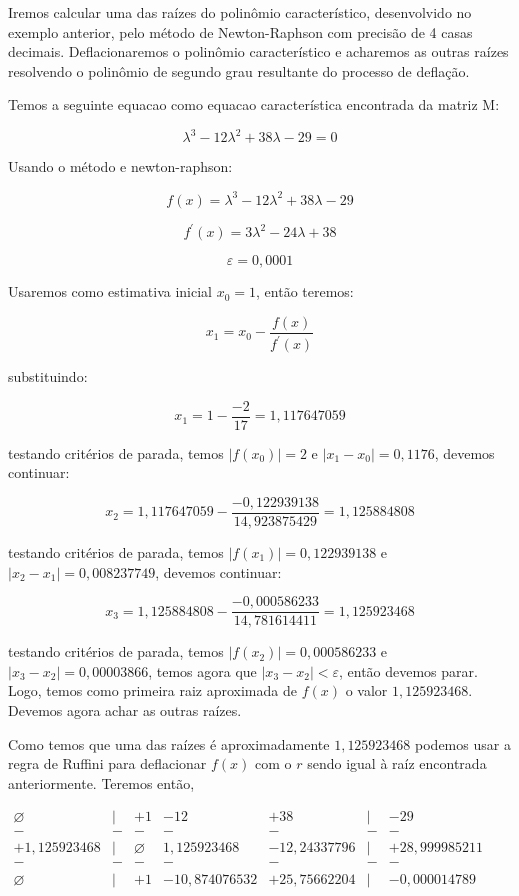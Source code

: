 \begin{example}
 Iremos calcular uma das raízes do polinômio característico, desenvolvido no exemplo anterior, pelo método de Newton-Raphson com precisão de 4 casas decimais. Deflacionaremos o polinômio característico e acharemos as outras raízes resolvendo o polinômio de segundo grau resultante do processo de deflação. 

Temos a seguinte equacao como equacao característica encontrada da matriz M:

$$\lambda^{3}-12\lambda^{2}+38\lambda-29=0$$

Usando o método e newton-raphson:

$$f(x)=\lambda^{3}-12\lambda^{2}+38\lambda-29$$

$$f^{'}(x)=3\lambda^{2}-24\lambda+38$$

$$\varepsilon=0,0001$$

Usaremos como estimativa inicial $x_{0}=1$, então teremos:

$$x_{1}=x_{0}-\frac{f(x)}{f^{'}(x)}$$

substituindo:

$$x_{1}=1-\frac{-2}{17}=1,117647059$$

testando critérios de parada, temos $|f(x_{0})|=2$ e $|x_{1}-x_{0}|=0,1176$, devemos continuar:

$$x_{2}=1,117647059-\frac{-0,122939138}{14,923875429}=1,125884808$$

testando critérios de parada, temos $|f(x_{1})|=0,122939138$ e $|x_{2}-x_{1}|=0,008237749$, devemos continuar:

$$x_{3}=1,125884808-\frac{-0,000586233}{14,781614411}=1,125923468$$

testando critérios de parada, temos $|f(x_{2})|=0,000586233$ e $|x_{3}-x_{2}|=0,00003866$, temos agora que $|x_{3}-x_{2}|<\varepsilon$, então devemos parar. Logo, temos como primeira raiz aproximada de $f(x)$ o valor $1,125923468$. Devemos agora achar as outras raízes.

Como temos que uma das raízes é aproximadamente $1,125923468$ podemos usar a regra de Ruffini para deflacionar $f(x)$ com o $r$ sendo igual à raíz encontrada anteriormente. Teremos então,

$\begin{array}{ccccccc}
\varnothing & | & +1 & -12 & +38 & | & -29\\
- & - & - & - & - & - & -\\
+1,125923468 & | & \varnothing & 1,125923468 & -12,24337796 & | & +28,999985211\\
- & - & - & - & - & - & -\\
\varnothing & | & +1 & -10,874076532 & +25,75662204 & | & -0,000014789\end{array}$


\end{example}
